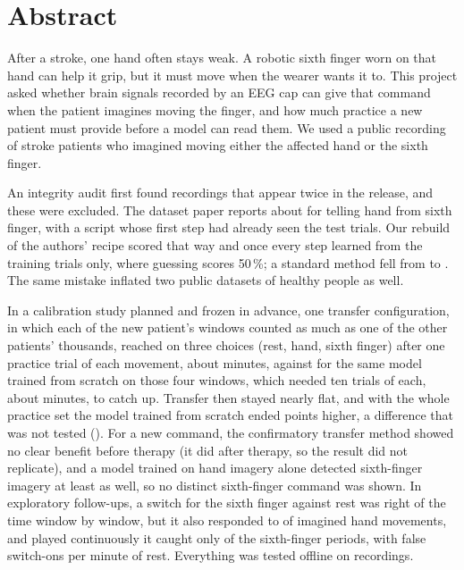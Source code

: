 \chapter*{Abstract}
After a stroke, one hand often stays weak. A robotic sixth finger worn on that hand can
help it grip, but it must move when the wearer wants it to. This project asked whether
brain signals recorded by an EEG cap can give that command when the patient imagines
moving the finger, and how much practice a new patient must provide before a model can
read them. We used a public recording of \nSubjects{} stroke patients who imagined moving
either the affected hand or the sixth finger.

An integrity audit first found recordings that appear twice in the release, and these
were excluded. The dataset paper reports about \pct{\rqOnePublishedGroupBCspLda} for
telling hand from sixth finger, with a script whose first step had already seen the test
trials. Our rebuild of the authors' recipe scored \pct{\rqOneCspLdaReplicaPaperReplicaMean}
that way and \pct{\rqOneCspLdaReplicaCvLeakfreeMean} once every step learned from the
training trials only, where guessing scores 50\,\%; a standard method fell from
\pct{\rqOneCspLdaPaperReplicaMean} to \pct{\rqOneCspLdaCvLeakfreeMean}. The same mistake
inflated two public datasets of healthy people as well.

In a calibration study planned and frozen in advance, one transfer configuration, in
which each of the new patient's windows counted as much as one of the other patients'
thousands, reached \pct{\rqTwoRestAhSfRctTslrKOneMean} on three choices (rest, hand,
sixth finger) after one practice trial of each movement, about \rqTwoMinutesKOne{}
minutes, against \pct{\rqTwoRestAhSfTsLrKOneMean} for the same model trained from scratch
on those four windows, which needed ten trials of each, about \rqTwoMinutesKTen{} minutes,
to catch up. Transfer then stayed nearly flat, and with the whole practice set the model
trained from scratch ended \rqTwoRestAhSfTsLrMinusRctTslrKAllDiff{} points higher, a
difference that was not tested
(\cipts{\rqTwoRestAhSfTsLrMinusRctTslrKAllDiffCiLo}{\rqTwoRestAhSfTsLrMinusRctTslrKAllDiffCiHi}).
For a new command, the confirmatory transfer method showed no clear benefit before therapy (it did after therapy,
so the result did not replicate), and a model trained on hand imagery alone detected
sixth-finger imagery at least as well, so no distinct sixth-finger command was shown. In
exploratory follow-ups, a switch for the sixth finger against rest was right
\pct{\exFourTsLrCentralMean} of the time window by window, but it also responded to
\pct{\exFourTsLrCentralFiresAhMean} of imagined hand movements, and played continuously it
caught only \pct{\exFiveFingerFingerOnMean} of the sixth-finger periods, with
\exFiveFingerFalsePerMinMean{} false switch-ons per minute of rest. Everything was tested
offline on recordings.


